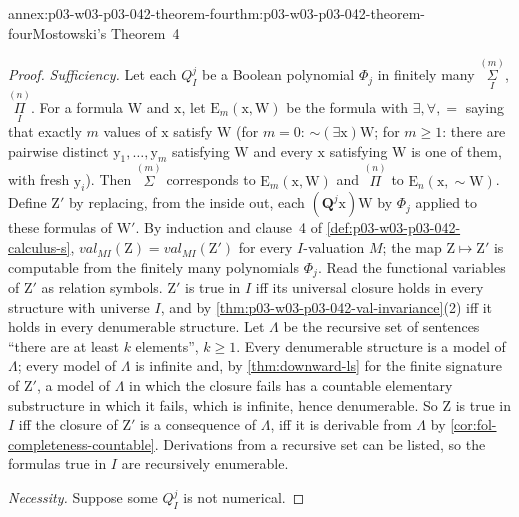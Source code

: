 \begin{annexitem}{annex:p03-w03-p03-042-theorem-four}{thm:p03-w03-p03-042-theorem-four}{Mostowski's Theorem~4}
\begin{proof}
\emph{Sufficiency.}  Let each \(Q^j_I\) be a Boolean polynomial
\(\Phi_j\) in finitely many \(\overset{(m)}{\underset I\Sigma}\),
\(\overset{(n)}{\underset I\Pi}\).  For a formula \(\mathrm W\) and
\(\mathrm x\), let \(\mathrm E_m(\mathrm x,\mathrm W)\) be the formula with
\(\exists,\forall,=\) saying that exactly \(m\) values of \(\mathrm x\)
satisfy \(\mathrm W\) (for \(m=0\): \({\sim}(\exists\mathrm x)\mathrm W\);
for \(m\geq1\): there are pairwise distinct \(\mathrm y_1,\ldots,\mathrm
y_m\) satisfying \(\mathrm W\) and every \(\mathrm x\) satisfying \(\mathrm
W\) is one of them, with fresh \(\mathrm y_i\)).  Then
\(\overset{(m)}\Sigma\) corresponds to \(\mathrm E_m(\mathrm x,\mathrm W)\)
and \(\overset{(n)}\Pi\) to \(\mathrm E_n(\mathrm x,{\sim}\mathrm W)\).
Define \(\mathrm Z'\) by replacing, from the inside out, each
\((\mathbf Q^j\mathrm x)\mathrm W\) by \(\Phi_j\) applied to these
formulas of \(\mathrm W'\).  By induction and clause~4 of
\cref{def:p03-w03-p03-042-calculus-s}, \(\mathit{val}_{MI}(\mathrm Z)=
\mathit{val}_{MI}(\mathrm Z')\) for every \(I\)-valuation \(M\); the map
\(\mathrm Z\mapsto\mathrm Z'\) is computable from the finitely many
polynomials \(\Phi_j\).  Read the functional variables of \(\mathrm Z'\)
as relation symbols.  \(\mathrm Z'\) is true in \(I\) iff its universal
closure holds in every structure with universe \(I\), and by
\cref{thm:p03-w03-p03-042-val-invariance}(2) iff it holds in every
denumerable structure.  Let \(\Lambda\) be the recursive set of sentences
``there are at least \(k\) elements'', \(k\geq1\).  Every denumerable
structure is a model of \(\Lambda\); every model of \(\Lambda\) is
infinite and, by \cref{thm:downward-ls} for the finite signature of
\(\mathrm Z'\), a model of \(\Lambda\) in which the closure fails has a
countable elementary substructure in which it fails, which is infinite,
hence denumerable.  So \(\mathrm Z\) is true in \(I\) iff the closure of
\(\mathrm Z'\) is a consequence of \(\Lambda\), iff it is derivable from
\(\Lambda\) by \cref{cor:fol-completeness-countable}.  Derivations
from a recursive set can be listed, so the formulas true in \(I\) are
recursively enumerable.

\emph{Necessity.}  Suppose some \(Q^j_I\) is not numerical.


\end{proof}
\end{annexitem}
